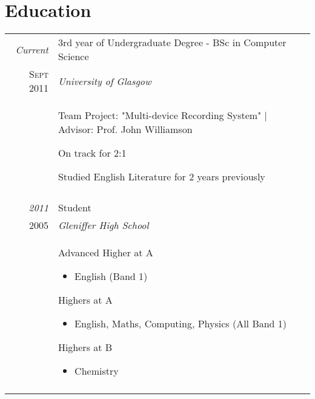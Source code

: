 \documentclass[a4paper,10pt]{article}
\begin{document}
\section{Education}
\begin{tabular}{r|p{11cm}}
 \emph{Current} & 3rd year of Undergraduate Degree - BSc in Computer Science \\\textsc{Sept 2011}&\emph{University of Glasgow}\\&\footnotesize{\par Team Project: "Multi-device Recording System" | Advisor: Prof. John Williamson \par On track for 2:1} \par Studied English Literature for 2 years previously\\\multicolumn{2}{c}{} \\
 \emph{2011} & Student \\\textsc{2005}&\emph{Gleniffer High School}\\&\footnotesize{Advanced Higher at A 
            \begin{itemize}
                \item English (Band 1)
            \end{itemize}
    \par Highers at A 
            \begin{itemize}
                \item English, Maths, Computing, Physics (All Band 1)
            \end{itemize}
    \par Highers at B
            \begin{itemize}
                \item Chemistry
            \end{itemize}}\\
    \multicolumn{2}{c}{} \\

\end{tabular}

\end{document}
